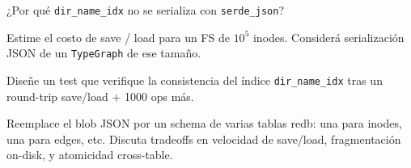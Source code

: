 \begin{ejercicio}[\dificultad{$\star$}]
\label{ej:pers-2}
¿Por qué \texttt{dir\_name\_idx} no se serializa con
\texttt{serde\_json}?
\end{ejercicio}

\begin{ejercicio}[\dificultad{$\star\star$}]
\label{ej:pers-3}
Estime el costo de save / load para un FS de \(10^5\) inodes.
Considerá serialización JSON de un \texttt{TypeGraph} de ese tamaño.
\end{ejercicio}

\begin{ejercicio}[\dificultad{$\star\star$}]
\label{ej:pers-4}
Diseñe un test que verifique la consistencia del índice
\texttt{dir\_name\_idx} tras un round-trip save/load + 1000 ops más.
\end{ejercicio}

\begin{ejercicio}[\dificultad{$\star\star\star$}]
\label{ej:pers-5}
Reemplace el blob JSON por un schema de varias tablas redb: una para
inodes, una para edges, etc. Discuta tradeoffs en velocidad de
save/load, fragmentación on-disk, y atomicidad cross-table.
\end{ejercicio}
